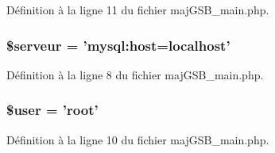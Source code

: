Définition à la ligne 11 du fichier maj\-G\-S\-B\-\_\-main.\-php.

\hypertarget{maj_g_s_b__main_8php_a4ffb9d7258acf24e1ff550bceba60ed2}{
\subsubsection[{\$serveur}]{\setlength{\rightskip}{0pt plus 5cm}\$serveur = 'mysql\-:host=localhost'}}\label{maj_g_s_b__main_8php_a4ffb9d7258acf24e1ff550bceba60ed2}


Définition à la ligne 8 du fichier maj\-G\-S\-B\-\_\-main.\-php.

\hypertarget{maj_g_s_b__main_8php_a598ca4e71b15a1313ec95f0df1027ca5}{
\subsubsection[{\$user}]{\setlength{\rightskip}{0pt plus 5cm}\$user = 'root'}}\label{maj_g_s_b__main_8php_a598ca4e71b15a1313ec95f0df1027ca5}


Définition à la ligne 10 du fichier maj\-G\-S\-B\-\_\-main.\-php.

